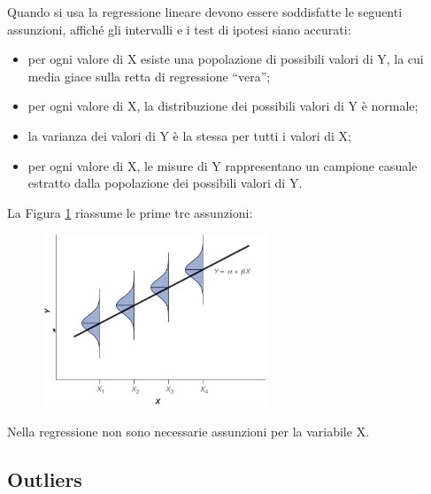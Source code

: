 \documentclass[10pt, draft]{book}
\newcommand{\tightlist}{%
\setlength{\itemsep}{1pt}\setlength{\parskip}{0pt}\setlength{\parsep}{0pt}}
\begin{document}
Quando si usa la regressione lineare devono essere soddisfatte le seguenti assunzioni, affiché gli intervalli e i test di ipotesi siano accurati:
\begin{itemize}\tightlist
    \item per ogni valore di X esiste una popolazione di possibili valori di Y, la cui media giace sulla retta di regressione ``vera'';
    \item per ogni valore di X, la distribuzione dei possibili valori di Y è normale;
    \item la varianza dei valori di Y è la stessa per tutti i valori di X;
    \item per ogni valore di X, le misure di Y rappresentano un campione casuale estratto dalla popolazione dei possibili valori di Y.
\end{itemize}
La Figura \ref{fig17.5-1} riassume le prime tre assunzioni:\\
\begin{figure}[H]
    \centering
    \includegraphics[width=0.6\textwidth]{fig17.5-1}
    \caption{\small{}}
    \label{fig17.5-1}
\end{figure}

Nella regressione non sono necessarie assunzioni per la variabile X.

\subsection{Outliers}
\end{document}
